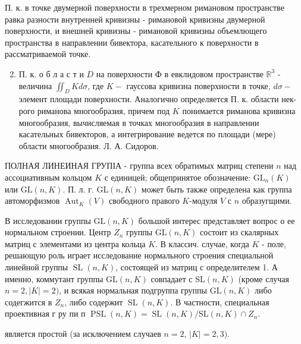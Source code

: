 \documentclass[10pt]{article}
\begin{document}
П. к. в точке двумерной поверхности в трехмерном римановом пространстве равка разности внутренней кривизны - римановой кривизны двумерной поверхности, и внешней кривизны - римановой кривизны объемлющего пространства в направлении бивектора, касательного к поверхности в рассматриваемой точке.



\begin{enumerate}

  \setcounter{enumi}{1}

  \item П. к. о б л а с т и $D$ на поверхности Ф в евклидовом пространстве $\mathbb{R}^{3}$ - величина $\iint_{D} K d \sigma$, где $K-$ гауссова кривизна поверхности в точке, $d \sigma-$ элемент площади поверхности. Аналогично определяется П. к. области нек-рого риманова многообразия, причем под $K$ понимается риманова кривизна многообразия, вычисляемая в точках многообразия в направлении касательных бивекторов, а интегрирование ведется по площади (мере) области многообразия. Л. А. Сидоров.

\end{enumerate}



ПОЛНАЯ ЛИНЕИНАЯ ГРУПІА - группа всех обратимых матриц степени $n$ над ассоциативным кольцом $K$ с единицей; общепринятое обозначение: $\mathrm{GL}_{n}(K)$ или $\mathrm{GL}(n, K)$. П. л. г. $\mathrm{GL}(n, K)$ может быть также определена как группа автоморфизмов $\operatorname{Aut}_{K}(V)$ свободного правого $K$-модуля $V$ с $n$ образугщими.



В исследовании группы $\mathrm{GL}(n, K)$ большой интерес представляет вопрос о ее нормальном строении. Центр $Z_{n}$ группы $\mathrm{GL}(n, K)$ состоит из скалярных матриц с элементами из центра кольца $K$. В классич. случае, когда $K$ - поле, решающую роль играет исследование нормального строения специальной линейной группы $\operatorname{SL}(n, K)$, состоящей из матриц с определителем 1. А именно, коммутант группы $\mathrm{GL}(n, K)$ совпадает с $\mathrm{SL}(n, K)$ (кроме случая $n=2,|K|=2)$, и всякая нормальная подгруппа группы $\mathrm{GL}(n, K)$ либо содегжится в $Z_{n}$, либо содержит $\operatorname{SL}(n, K)$. В частности, специальная проективная г ру пи п $\operatorname{PSL}(n, K)=\operatorname{SL}(n, K) / \mathrm{SL}(n, K) \cap Z_{n}$.



является простой (за исключением случаев $n=2$, $|K|=2,3)$.
\end{document}
